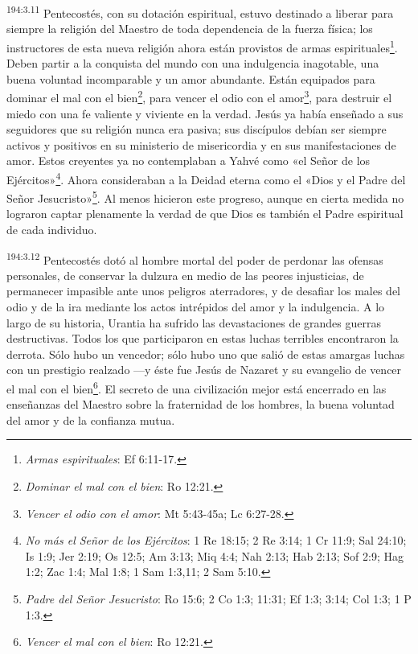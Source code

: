 \par
\textsuperscript{194:3.11} Pentecostés, con su dotación espiritual, estuvo destinado a liberar para siempre la religión del Maestro de toda dependencia de la fuerza física; los instructores de esta nueva religión ahora están provistos de armas espirituales\footnote{\textit{Armas espirituales}: Ef 6:11-17.}. Deben partir a la conquista del mundo con una indulgencia inagotable, una buena voluntad incomparable y un amor abundante. Están equipados para dominar el mal con el bien\footnote{\textit{Dominar el mal con el bien}: Ro 12:21.}, para vencer el odio con el amor\footnote{\textit{Vencer el odio con el amor}: Mt 5:43-45a; Lc 6:27-28.}, para destruir el miedo con una fe valiente y viviente en la verdad. Jesús ya había enseñado a sus seguidores que su religión nunca era pasiva; sus discípulos debían ser siempre activos y positivos en su ministerio de misericordia y en sus manifestaciones de amor. Estos creyentes ya no contemplaban a Yahvé como «el Señor de los Ejércitos»\footnote{\textit{No más el Señor de los Ejércitos}: 1 Re 18:15; 2 Re 3:14; 1 Cr 11:9; Sal 24:10; Is 1:9; Jer 2:19; Os 12:5; Am 3:13; Miq 4:4; Nah 2:13; Hab 2:13; Sof 2:9; Hag 1:2; Zac 1:4; Mal 1:8; 1 Sam 1:3,11; 2 Sam 5:10.}. Ahora consideraban a la Deidad eterna como el «Dios y el Padre del Señor Jesucristo»\footnote{\textit{Padre del Señor Jesucristo}: Ro 15:6; 2 Co 1:3; 11:31; Ef 1:3; 3:14; Col 1:3; 1 P 1:3.}. Al menos hicieron este progreso, aunque en cierta medida no lograron captar plenamente la verdad de que Dios es también el Padre espiritual de cada individuo.

\par
\textsuperscript{194:3.12} Pentecostés dotó al hombre mortal del poder de perdonar las ofensas personales, de conservar la dulzura en medio de las peores injusticias, de permanecer impasible ante unos peligros aterradores, y de desafiar los males del odio y de la ira mediante los actos intrépidos del amor y la indulgencia. A lo largo de su historia, Urantia ha sufrido las devastaciones de grandes guerras destructivas. Todos los que participaron en estas luchas terribles encontraron la derrota. Sólo hubo un vencedor; sólo hubo uno que salió de estas amargas luchas con un prestigio realzado ---y éste fue Jesús de Nazaret y su evangelio de vencer el mal con el bien\footnote{\textit{Vencer el mal con el bien}: Ro 12:21.}. El secreto de una civilización mejor está encerrado en las enseñanzas del Maestro sobre la fraternidad de los hombres, la buena voluntad del amor y de la confianza mutua.

